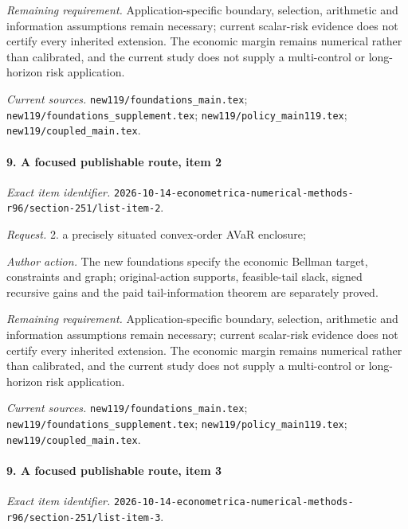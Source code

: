 \par\emph{Remaining requirement.} Application-specific boundary, selection, arithmetic and information assumptions remain necessary; current scalar-risk evidence does not certify every inherited extension. The economic margin remains numerical rather than calibrated, and the current study does not supply a multi-control or long-horizon risk application.

\par\emph{Current sources.} \nolinkurl{new119/foundations_main.tex}; \nolinkurl{new119/foundations_supplement.tex}; \nolinkurl{new119/policy_main119.tex}; \nolinkurl{new119/coupled_main.tex}.

\paragraph{9. A focused publishable route, item 2}

\emph{Exact item identifier.} \nolinkurl{2026-10-14-econometrica-numerical-methods-r96/section-251/list-item-2}.

\par\emph{Request.} 2. a precisely situated convex-order AVaR enclosure;

\par\emph{Author action.} The new foundations specify the economic Bellman target, constraints and graph; original-action supports, feasible-tail slack, signed recursive gains and the paid tail-information theorem are separately proved.

\par\emph{Remaining requirement.} Application-specific boundary, selection, arithmetic and information assumptions remain necessary; current scalar-risk evidence does not certify every inherited extension. The economic margin remains numerical rather than calibrated, and the current study does not supply a multi-control or long-horizon risk application.

\par\emph{Current sources.} \nolinkurl{new119/foundations_main.tex}; \nolinkurl{new119/foundations_supplement.tex}; \nolinkurl{new119/policy_main119.tex}; \nolinkurl{new119/coupled_main.tex}.

\paragraph{9. A focused publishable route, item 3}

\emph{Exact item identifier.} \nolinkurl{2026-10-14-econometrica-numerical-methods-r96/section-251/list-item-3}.


